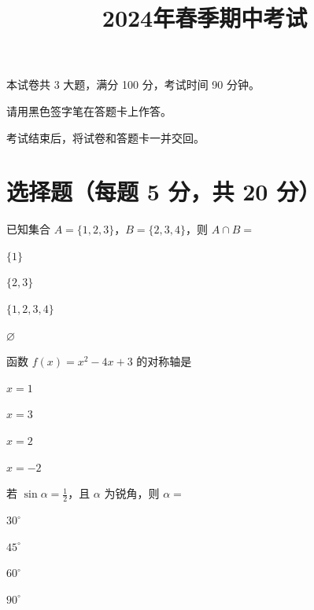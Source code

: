 \documentclass{exam-zh}
\begin{document}
\title{2024年春季期中考试}
\subject{数学}
\maketitle


\begin{notice}
  \item 本试卷共 3 大题，满分 100 分，考试时间 90 分钟。
  \item 请用黑色签字笔在答题卡上作答。
  \item 考试结束后，将试卷和答题卡一并交回。
\end{notice}

\vspace{1em}

\section{选择题（每题 5 分，共 20 分）}

\begin{question}
  已知集合 $A = \{1, 2, 3\}$，$B = \{2, 3, 4\}$，则 $A \cap B = $ \paren[B]
  \begin{choices}
    \item $\{1\}$
    \item $\{2, 3\}$   %
    \item $\{1, 2, 3, 4\}$
    \item $\varnothing$
  \end{choices}
\end{question}

\begin{question}
  函数 $f(x) = x^2 - 4x + 3$ 的对称轴是\paren[C]
  \begin{choices}
    \item $x = 1$
    \item $x = 3$
    \item $x = 2$   %
    \item $x = -2$
  \end{choices}
\end{question}

\begin{question}
  若 $\sin \alpha = \frac{1}{2}$，且 $\alpha$ 为锐角，则 $\alpha = $ \paren[A]
  \begin{choices}
    \item $30^\circ$   %
    \item $45^\circ$
    \item $60^\circ$
    \item $90^\circ$
  \end{choices}
\end{question}
\end{document}
